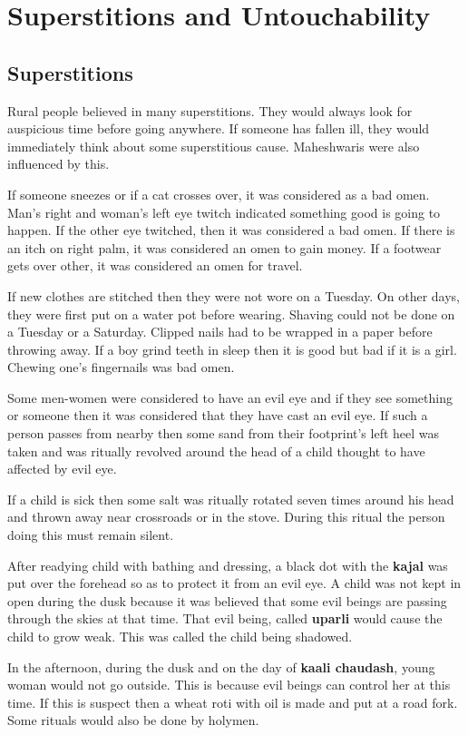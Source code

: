\chapter{Superstitions and Untouchability}
\section{Superstitions}
Rural people believed in many superstitions. They would always look for
auspicious time before going anywhere. If someone has fallen ill, they would
immediately think about some superstitious cause. Maheshwaris were also
influenced by this.

If someone sneezes or if a cat crosses over, it was considered as a bad omen.
Man's right and woman's left eye twitch indicated something good is going to
happen. If the other eye twitched, then it was considered a bad omen. If there
is an itch on right palm, it was considered an omen to gain money. If a
footwear gets over other, it was considered an omen for travel.

If new clothes are stitched then they were not wore on a Tuesday. On other
days, they were first put on a water pot before wearing. Shaving could not be
done on a Tuesday or a Saturday. Clipped nails had to be wrapped in a paper
before throwing away. If a boy grind teeth in sleep then it is good but bad if
it is a girl. Chewing one's fingernails was bad omen.

Some men-women were considered to have an evil eye and if they see something or
someone then it was considered that they have cast an evil eye. If such a
person passes from nearby then some sand from their footprint's left heel was
taken and was ritually revolved around the head of a child thought to have
affected by evil eye.

If a child is sick then some salt was ritually rotated seven times around his
head and thrown away near crossroads or in the stove. During this ritual the
person doing this must remain silent.

After readying child with bathing and dressing, a black dot with the
\textbf{kajal} was put over the forehead so as to protect it from an evil eye.
A child was not kept in open during the dusk because it was believed that some
evil beings are passing through the skies at that time. That evil being, called
\textbf{uparli} would cause the child to grow weak. This was called the child
being shadowed.

In the afternoon, during the dusk and on the day of \textbf{kaali chaudash},
young woman would not go outside. This is because evil beings can control her
at this time. If this is suspect then a wheat roti with oil is made and put at
a road fork. Some rituals would also be done by holymen.

